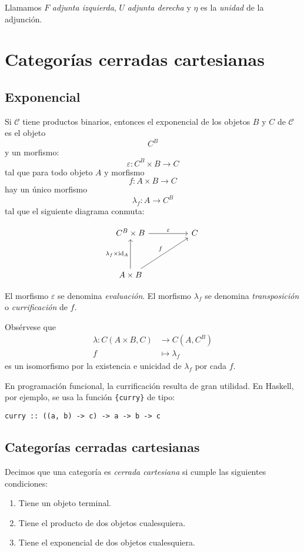 \documentclass[12pt, twoside]{book}
\newcommand{\code}[1]{\Verb+{#1}+}
\newcommand{\cat}{{\mathcal{C}}}
\DeclareMathOperator{\id}{id}
\begin{document}
Llamamos $F$ \emph{adjunta izquierda}, $U$ \emph{adjunta derecha} y $\eta$ es la \emph{unidad} de la adjunción.
\chapter{Categorías cerradas cartesianas}
\section{Exponencial}
Si $\cat$ tiene productos binarios, entonces el exponencial de los objetos $B$ y $C$ de $\cat$ es el objeto
\[ C^B \]
y un morfismo:
\[ \varepsilon \colon C^B \times B \to C \]
tal que para todo objeto $A$ y morfismo
\[ f \colon A \times B \to C \]
hay un único morfismo
\[ \lambda_f \colon A \to C^B \]
tal que el siguiente diagrama conmuta:

\[
\begin{tikzcd}
C^B \times B \arrow[rr,"\varepsilon"] & & C \\\\
A \times B \arrow[uu,"\lambda_f\times\id_A"]  \arrow[uurr,"f"]
\end{tikzcd}
\]

El morfismo $\varepsilon$ se denomina \emph{evaluación}.
El morfismo $\lambda_f$ se denomina \emph{transposición} o \emph{currificación} de $f$.

Obsérvese que
\begin{align*}
\lambda \colon C(A \times B, C) & \to C(A,C^B)\\
f & \mapsto \lambda_f
\end{align*}
es un isomorfismo por la existencia e unicidad de $\lambda_f$ por cada $f$.

En programación funcional, la currificación resulta de gran utilidad.
En Haskell, por ejemplo, se usa la función \code{curry} de tipo:
\begin{verbatim}
curry :: ((a, b) -> c) -> a -> b -> c
\end{verbatim}

\section{Categorías cerradas cartesianas}
\begin{definition}
Decimos que una categoría es \emph{cerrada cartesiana} si cumple las siguientes condiciones:
\begin{enumerate}
\item Tiene un objeto terminal.
\item Tiene el producto de dos objetos cualesquiera.
\item Tiene el exponencial de dos objetos cualesquiera.
\end{enumerate}
\end{definition}
\end{document}
